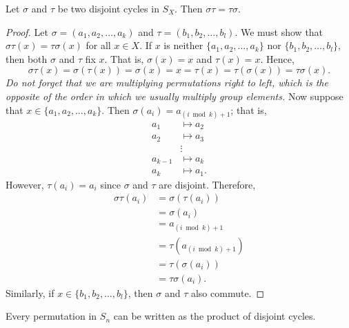  
\begin{proposition}
Let $\sigma$ and $\tau$ be two disjoint cycles in $S_X$. Then $\sigma
\tau = \tau \sigma$. 
\end{proposition}
 
\begin{proof}
Let $\sigma = (a_1, a_2, \ldots, a_k )$ and $\tau = (b_1, b_2, \ldots,
b_l )$. We must show that $\sigma \tau(x) = \tau \sigma(x)$ for all $x
\in X$. If $x$ is neither $\{ a_1, a_2, \ldots, a_k \}$ nor $\{b_1,
b_2, \ldots, b_l  \}$, then both $\sigma$ and $\tau$ fix $x$. That is,
$\sigma(x)=x$ and $\tau(x)=x$. Hence, 
\[
\sigma \tau(x) = \sigma( \tau(x)) = \sigma(x) = x = \tau(x)
= \tau( \sigma(x)) =  \tau \sigma(x).
\]
{\em Do not forget that we are multiplying permutations right to left,
which is the opposite of the order in which we usually multiply group
elements.}  Now suppose that $x \in \{ a_1, a_2, \ldots, a_k \}$. Then 
$\sigma( a_i ) = a_{(i \bmod k) + 1}$; that is, 
\begin{align*}
a_1 & \mapsto  a_2 \\
a_2 & \mapsto  a_3 \\
& \vdots  \\
a_{k-1} & \mapsto  a_k \\
a_k & \mapsto  a_1.
\end{align*}
However, $\tau(a_i) = a_i$ since $\sigma$ and $\tau$ are disjoint.
Therefore, 
\begin{align*}
\sigma \tau(a_i) & = \sigma( \tau(a_i)) \\
& = \sigma(a_i) \\ 
& = a_{(i \bmod k)+1} \\
& = \tau( a_{(i \bmod k)+1} ) \\
& = \tau( \sigma(a_i) ) \\
& = \tau \sigma(a_i).
\end{align*}
Similarly, if $x \in \{b_1, b_2, \ldots, b_l  \}$, then $\sigma$ and
$\tau$ also commute. 
\end{proof}
 
\begin{theorem}
Every permutation in $S_n$ can be written as the product of disjoint
cycles. 
\end{theorem}
 
 
 
